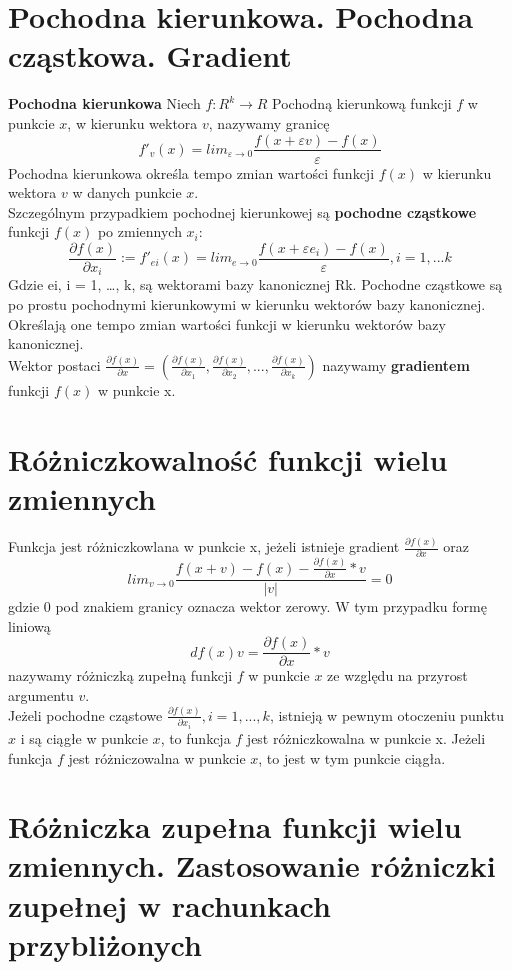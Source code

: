 \documentclass[10pt]{article}
\begin{document}
\section{Pochodna kierunkowa. Pochodna cząstkowa. Gradient}
    \textbf{Pochodna kierunkowa}
    Niech $f:R^k \rightarrow R$ Pochodną kierunkową funkcji $f$ w punkcie $x$, w kierunku
    wektora $v$, nazywamy granicę
    $$f'_v(x)=lim_{\varepsilon \rightarrow 0}\frac{f(x+\varepsilon v)-f(x)}{\varepsilon}$$
    Pochodna kierunkowa określa tempo zmian wartości funkcji $f(x)$ w kierunku wektora $v$ w danych punkcie $x$.\\
    Szczególnym przypadkiem pochodnej kierunkowej są \textbf{pochodne cząstkowe} funkcji $f(x)$ po zmiennych $x_i$:
    $$\frac{\partial f(x)}{\partial x_i}:=f'_{ei}(x)= lim_{e\rightarrow 0}\frac{f(x+\varepsilon e_i)-f(x)}{\varepsilon}, i=1,...k$$
    Gdzie ei, i = 1, …, k, są wektorami bazy kanonicznej Rk. Pochodne cząstkowe są po prostu pochodnymi kierunkowymi w kierunku wektorów bazy kanonicznej. Określają one tempo zmian wartości funkcji w kierunku wektorów bazy kanonicznej. \\
    Wektor postaci $\frac{\partial f(x)}{\partial x}=({\frac{\partial f(x)}{\partial x_1}},\frac{\partial f(x)}{\partial x_2},...,\frac{\partial f(x)}{\partial x_k})$ nazywamy \textbf{gradientem} funkcji $f(x)$ w punkcie x.  
\section{Różniczkowalność funkcji wielu zmiennych}
    Funkcja jest różniczkowlana w punkcie x, jeżeli istnieje gradient $\frac{\partial f(x)}{\partial x}$ oraz $$lim_{v \rightarrow 0}\frac{f(x+v)-f(x)-\frac{\partial f(x)}{\partial x}*v}{|v|}=0$$
    gdzie 0 pod znakiem granicy oznacza wektor zerowy. W tym przypadku formę liniową  $$df(x)v=\frac{\partial f(x)}{\partial x}*v$$ nazywamy różniczką zupełną funkcji $f$ w punkcie $x$ ze względu na przyrost argumentu $v$.\\
    Jeżeli pochodne cząstowe $\frac{\partial f(x)}{\partial x_i}, i=1,...,k$, istnieją w pewnym otoczeniu punktu $x$ i są ciągłe w punkcie $x$, to funkcja $f$ jest różniczkowalna w punkcie x. Jeżeli funkcja $f$ jest różniczowalna w punkcie $x$, to jest w tym punkcie ciągła.
\section{Różniczka zupełna funkcji wielu zmiennych. Zastosowanie różniczki zupełnej w rachunkach przybliżonych}
    
\end{document}
